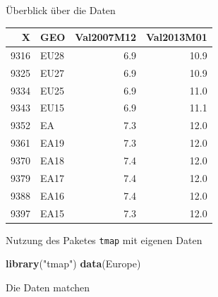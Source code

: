 \documentclass[ignorenonframetext,]{beamer}
\newenvironment{Shaded}{\begin{snugshade}}{\end{snugshade}}
\newcommand{\KeywordTok}[1]{\textcolor[rgb]{0.13,0.29,0.53}{\textbf{#1}}}
\newcommand{\DecValTok}[1]{\textcolor[rgb]{0.00,0.00,0.81}{#1}}
\newcommand{\StringTok}[1]{\textcolor[rgb]{0.31,0.60,0.02}{#1}}
\newcommand{\OperatorTok}[1]{\textcolor[rgb]{0.81,0.36,0.00}{\textbf{#1}}}
\newcommand{\NormalTok}[1]{#1}
\begin{document}
\begin{frame}{Überblick über die Daten}

\begin{longtable}[]{@{}rlrr@{}}
\toprule
X & GEO & Val2007M12 & Val2013M01\tabularnewline
\midrule
\endhead
9316 & EU28 & 6.9 & 10.9\tabularnewline
9325 & EU27 & 6.9 & 10.9\tabularnewline
9334 & EU25 & 6.9 & 11.0\tabularnewline
9343 & EU15 & 6.9 & 11.1\tabularnewline
9352 & EA & 7.3 & 12.0\tabularnewline
9361 & EA19 & 7.3 & 12.0\tabularnewline
9370 & EA18 & 7.4 & 12.0\tabularnewline
9379 & EA17 & 7.4 & 12.0\tabularnewline
9388 & EA16 & 7.4 & 12.0\tabularnewline
9397 & EA15 & 7.3 & 12.0\tabularnewline
\bottomrule
\end{longtable}

\end{frame}

\begin{frame}[fragile]{Nutzung des Paketes \texttt{tmap} mit eigenen
Daten}

\begin{Shaded}
\begin{Highlighting}[]
\KeywordTok{library}\NormalTok{(}\StringTok{"tmap"}\NormalTok{)}
\KeywordTok{data}\NormalTok{(Europe)}
\end{Highlighting}
\end{Shaded}

\begin{block}{Die Daten matchen}

\begin{Shaded}
\end{Shaded}

\end{block}

\end{frame}
\end{document}

